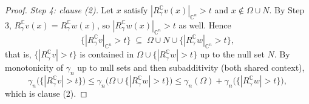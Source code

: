\begin{proof}
\emph{Step 4: clause (2).}
Let $x$ satisfy $|R_\gamma^{\mathbb{C}} v(x)|_{\mathbb{C}^n} > t$ and
$x \notin \Omega \cup N$.  By Step 3,
$R_\gamma^{\mathbb{C}} v(x) = R_\gamma^{\mathbb{C}} w(x)$, so
$|R_\gamma^{\mathbb{C}} w(x)|_{\mathbb{C}^n} > t$ as well.  Hence
\[
  \{|R_\gamma^{\mathbb{C}} v|_{\mathbb{C}^n} > t\}
    \;\subseteq\; \Omega \cup N \cup
      \{|R_\gamma^{\mathbb{C}} w|_{\mathbb{C}^n} > t\} ,
\]
that is, $\{|R_\gamma^{\mathbb{C}} v| > t\}$ is contained in
$\Omega \cup \{|R_\gamma^{\mathbb{C}} w| > t\}$ up to the null set $N$.  By
monotonicity of $\gamma_n$ up to null sets and then subadditivity (both shared
context),
\[
  \gamma_n\bigl(\{|R_\gamma^{\mathbb{C}} v| > t\}\bigr)
    \leq \gamma_n\bigl(\Omega \cup \{|R_\gamma^{\mathbb{C}} w| > t\}\bigr)
    \leq \gamma_n(\Omega)
      + \gamma_n\bigl(\{|R_\gamma^{\mathbb{C}} w| > t\}\bigr) ,
\]
which is clause (2).
\end{proof}
